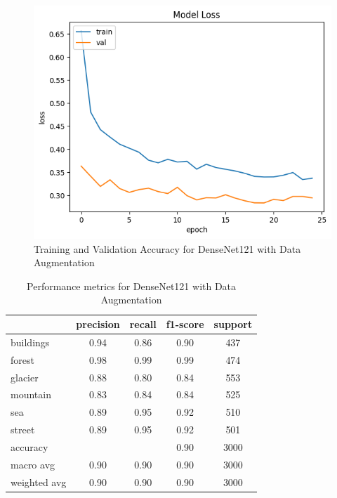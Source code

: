\documentclass[conference]{IEEEtran}
\begin{document}
\begin{figure}[H]
    \centering
    \includegraphics[width=1\linewidth]{images//DenseNet/Traning_Validation_Loss_DenseNet_Data_Augmented.png}
    \caption{Training and Validation Accuracy for DenseNet121 with Data Augmentation}
    \label{fig:TV_Loss_DenseNet_DA}
\end{figure}

\begin{table}[H]
\centering
\begin{tabular}{lcccc}
\toprule
\textbf{} & \textbf{precision} & \textbf{recall} & \textbf{f1-score} & \textbf{support} \\
\midrule
buildings & 0.94 & 0.86 & 0.90 & 437 \\
forest & 0.98 & 0.99 & 0.99 & 474 \\
glacier & 0.88 & 0.80 & 0.84 & 553 \\
mountain & 0.83 & 0.84 & 0.84 & 525 \\
sea & 0.89 & 0.95 & 0.92 & 510 \\
street & 0.89 & 0.95 & 0.92 & 501 \\
\midrule
accuracy & & & 0.90 & 3000 \\
macro avg & 0.90 & 0.90 & 0.90 & 3000 \\
weighted avg & 0.90 & 0.90 & 0.90 & 3000 \\
\bottomrule
\end{tabular}
\caption{Performance metrics for DenseNet121 with Data Augmentation}
\end{table}
\end{document}
